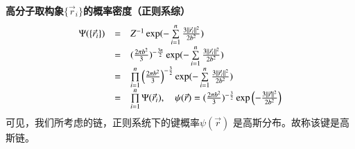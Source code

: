\documentclass{article} %
\begin{document}
{\bf  高分子取构象$\{ \vec{r}_{i} \} $的概率密度（正则系综）
\[\begin{array}{rcl} {\Psi (\{ \vec{r}_{i} \} )} & {=} & {Z^{-1} \exp (-\mathop{\sum }\limits_{i=1}^{n} \frac{3\parallel \vec{r}_{i} \parallel ^{2} }{2b^{2} } )} \\ {} & {=} & {(\frac{2\pi b^{2} }{3} )^{-\frac{3n}{2} } \exp (-\mathop{\sum }\limits_{i=1}^{n} \frac{3\parallel \vec{r}_{i} \parallel ^{2} }{2b^{2} } )} \\ {} & {=} & {\mathop{\prod }\limits_{i=1}^{n} \left(\frac{2\pi b^{2} }{3} \right)^{-\frac{3}{2} } \exp (-\mathop{\sum }\limits_{i=1}^{n} \frac{3\parallel \vec{r}_{i} \parallel ^{2} }{2b^{2} } )} \\ {} & {=} & {\mathop{\prod }\limits_{i=1}^{n} {\rm \Psi }(\vec{r}_{i} ),\quad \psi (\vec{r})=(\frac{2\pi b^{2} }{3} )^{-\frac{3}{2} } \exp \left(-\frac{3\parallel \vec{r}\parallel ^{2} }{2b^{2} } \right)} \end{array}\] }
可见，我们所考虑的链，正则系统下的键概率$\psi (\vec{r})$ 是高斯分布。故称该键是高斯链。
\end{document}

